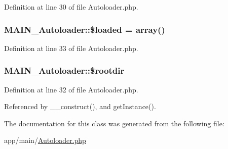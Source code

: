 Definition at line 30 of file Autoloader.php.\hypertarget{classMAIN__Autoloader_a93fa8cea8b9c2e30d179521ab8c3edab}{
\subsubsection[{\$loaded}]{\setlength{\rightskip}{0pt plus 5cm}MAIN\_\-Autoloader::\$loaded = array()}}
\label{dd/d71/classMAIN__Autoloader_a93fa8cea8b9c2e30d179521ab8c3edab}


Definition at line 33 of file Autoloader.php.\hypertarget{classMAIN__Autoloader_ab05969a6f2b5904a8de5e2f530441be7}{
\subsubsection[{\$rootdir}]{\setlength{\rightskip}{0pt plus 5cm}MAIN\_\-Autoloader::\$rootdir}}
\label{dd/d71/classMAIN__Autoloader_ab05969a6f2b5904a8de5e2f530441be7}


Definition at line 32 of file Autoloader.php.

Referenced by \_\-\_\-construct(), and getInstance().

The documentation for this class was generated from the following file:\begin{DoxyCompactItemize}
\item 
app/main/\hyperlink{Autoloader_8php}{Autoloader.php}\end{DoxyCompactItemize}
